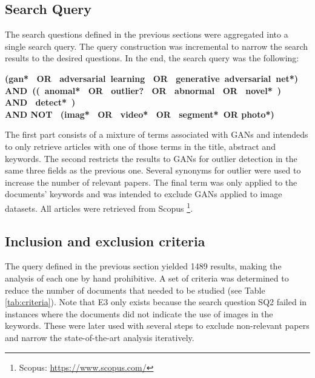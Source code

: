 \subsection{Search Query}\label{sec:gan_search_queries}
The search questions defined in the previous sections were aggregated into a single search query. The query construction was incremental to narrow the search results to the desired questions. In the end, the search query was the following:
\begin{center}
\textbf{(gan*  OR  adversarial learning  OR  generative adversarial net*) \\ AND (( anomal*  OR  outlier?  OR  abnormal  OR  novel* )  AND  detect* ) \\ AND NOT  (imag*  OR  video*  OR  segment* OR photo*)}
\end{center}

The first part consists of a mixture of terms associated with GANs and intendeds to only retrieve articles with one of those terms in the title, abstract and keywords. The second restricts the results to GANs for outlier detection in the same three fields as the previous one. Several synonyms for outlier were used to increase the number of relevant papers. The final term was only applied to the documents' keywords and was intended to exclude GANs applied to image datasets. All articles were retrieved from Scopus \footnote{Scopus: \url{https://www.scopus.com/}}.


\subsection{Inclusion and exclusion criteria}\label{sec:gan_inclusion_exclusion}
The query defined in the previous section yielded 1489 results, making the analysis of each one by hand prohibitive. A set of criteria was determined to reduce the number of documents that needed to be studied (see Table \ref{tab:criteria}). Note that E3 only exists because the search question SQ2 failed in instances where the documents did not indicate the use of images in the keywords. These were later used with several steps to exclude non-relevant papers and narrow the state-of-the-art analysis iteratively. 

